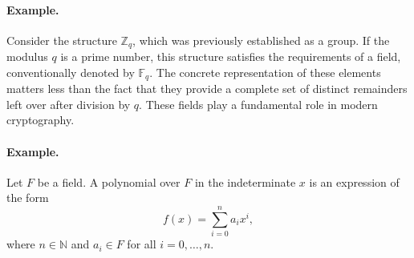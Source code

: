 




\paragraph{Example.}
Consider the structure $\mathbb{Z}_q$, which was previously established as a group. If the modulus $q$ is a prime number, this structure satisfies the requirements of a field, conventionally denoted by $\mathbb{F}_q$. The concrete representation of these elements matters less than the fact that they provide a complete set of distinct remainders left over after division by $q$. These fields play a fundamental role in modern cryptography.


\paragraph{Example.}
Let $F$ be a field. A polynomial over $F$ in the indeterminate $x$ is an expression of the form
\[
f(x) = \sum_{i=0}^{n} a_i x^i,
\]
where $n \in \mathbb{N}$ and $a_i \in F$ for all $i = 0,\dots,n$.

